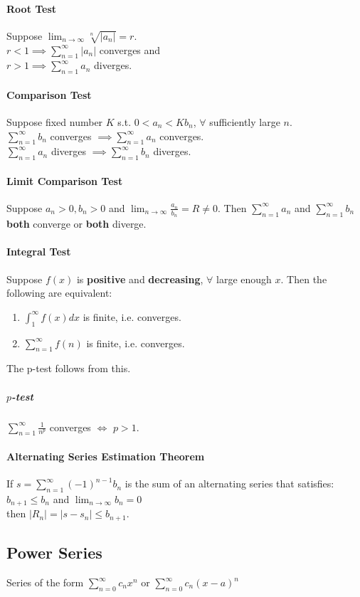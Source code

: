 \documentclass[12 pt]{article}
\theoremstyle{definition}
\begin{document}
	\paragraph{Root Test} Suppose $\lim_{n\to \infty}\sqrt[n]{|a_n|}=r$. 
	\\$r<1 \implies \sum_{n=1}^{\infty}|a_n|$ converges and 
	\\$r>1 \implies \sum_{n=1}^{\infty}a_n$ diverges.
	\paragraph{Comparison Test} Suppose fixed number $K$ s.t. $0<a_n<Kb_n$, $\forall$ sufficiently large $n$. 
	\\ $\sum_{n=1}^{\infty}b_n$ converges $\implies \sum_{n=1}^{\infty} a_n$ converges.
	\\ $\sum_{n=1}^{\infty}a_n$ diverges $\implies \sum_{n=1}^{\infty} b_n$ diverges.
	\paragraph{Limit Comparison Test} Suppose $a_n>0,b_n>0$ and $\lim_{n\to \infty}\frac{a_n}{b_n}=R\neq 0$. Then $\sum_{n=1}^{\infty}a_n$ and $\sum_{n=1}^{\infty}b_n$ \textbf{both} converge or \textbf{both} diverge.
	\paragraph{Integral Test} Suppose $f(x)$ is \textbf{positive} and \textbf{decreasing}, $\forall$ large enough $x$. Then the following are equivalent:
	\begin{enumerate}[1)]
		\item $\int_{1}^{\infty} f(x)dx$ is finite, i.e. converges.
		\item $\sum_{n=1}^{\infty}f(n)$ is finite, i.e. converges.
	\end{enumerate}
The p-test follows from this.
\subparagraph{$p$-test}
$\sum_{n=1}^{\infty} \frac{1}{n^p}$ converges $\iff$ $p>1$.
\paragraph{Alternating Series Estimation Theorem} If $s=\sum_{n=1}^{\infty}(-1)^{n-1}b_n$ is the sum of an alternating series that satisfies:
\\ $b_{n+1}\leq b_n$ and $\lim_{n\to \infty}b_n=0$
\\ then $|R_n|=|s-s_n|\leq b_{n+1}$.
\subsection{Power Series}Series of the form $\sum_{n=0}^{\infty}c_n x^n$ or $\sum_{n=0}^{\infty}c_n(x-a)^n$
\end{document}
